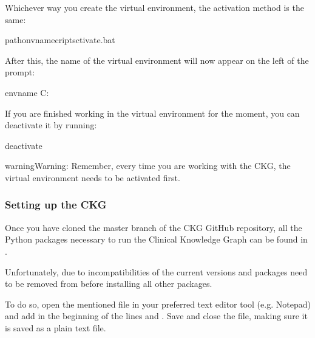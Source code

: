 \documentclass[letterpaper,10pt,english]{sphinxmanual}
\begin{document}
Whichever way you create the virtual environment, the activation method is the same:

\begin{sphinxVerbatim}[commandchars=\\\{\}]
\PYGZgt{} pathonv\PYGZus{}namecriptsctivate.bat
\end{sphinxVerbatim}

After this, the name of the virtual environment will now appear on the left of the prompt:

\begin{sphinxVerbatim}[commandchars=\\\{\}]
env\PYGZus{}name C:
\end{sphinxVerbatim}

If you are finished working in the virtual environment for the moment, you can deactivate it by running:

\begin{sphinxVerbatim}[commandchars=\\\{\}]
\PYGZgt{} deactivate
\end{sphinxVerbatim}

\begin{sphinxadmonition}{warning}{Warning:}
Remember, every time you are working with the CKG, the virtual environment needs to be activated first.
\end{sphinxadmonition}


\subsubsection{Setting up the CKG}
\label{\detokenize{intro/getting-started-with-windows:setting-up-the-ckg}}
Once you have cloned the master branch of the CKG GitHub repository, all the Python packages necessary to run the Clinical Knowledge Graph can be found in .

Unfortunately, due to incompatibilities of the current versions  and  packages need to be removed from  before installing all other packages.

To do so, open the mentioned file in your preferred text editor tool (e.g. Notepad) and add \sphinxcode{\sphinxupquote{\#}} in the beginning of the lines  and . Save and close the file, making sure it is saved as a plain text file.
\end{document}
